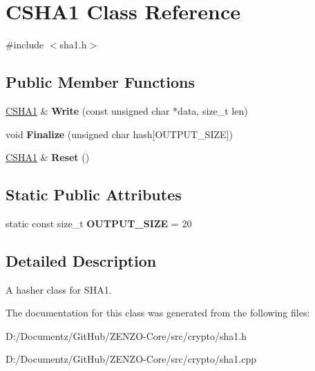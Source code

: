 \hypertarget{class_c_s_h_a1}{}\section{C\+S\+H\+A1 Class Reference}
\label{class_c_s_h_a1}


{\ttfamily \#include $<$sha1.\+h$>$}

\subsection*{Public Member Functions}
\begin{DoxyCompactItemize}
\item 
\mbox{\label{class_c_s_h_a1_a4322be694ccb2d9864e0cd0c30496a8a}} 
\mbox{\hyperlink{class_c_s_h_a1}{C\+S\+H\+A1}} \& {\bfseries Write} (const unsigned char $\ast$data, size\+\_\+t len)
\item 
\mbox{\label{class_c_s_h_a1_a9a4f829cbe511ca899d27dcab1d0d9e6}} 
void {\bfseries Finalize} (unsigned char hash\mbox{[}O\+U\+T\+P\+U\+T\+\_\+\+S\+I\+ZE\mbox{]})
\item 
\mbox{\label{class_c_s_h_a1_ab7f3006a33ddccdc1f2b2f5da9cb90af}} 
\mbox{\hyperlink{class_c_s_h_a1}{C\+S\+H\+A1}} \& {\bfseries Reset} ()
\end{DoxyCompactItemize}
\subsection*{Static Public Attributes}
\begin{DoxyCompactItemize}
\item 
\mbox{\label{class_c_s_h_a1_a4dc144e60b3e32e7b2908096ecb413ef}} 
static const size\+\_\+t {\bfseries O\+U\+T\+P\+U\+T\+\_\+\+S\+I\+ZE} = 20
\end{DoxyCompactItemize}


\subsection{Detailed Description}
A hasher class for S\+H\+A1. 

The documentation for this class was generated from the following files\+:\begin{DoxyCompactItemize}
\item 
D\+:/\+Documentz/\+Git\+Hub/\+Z\+E\+N\+Z\+O-\/\+Core/src/crypto/sha1.\+h\item 
D\+:/\+Documentz/\+Git\+Hub/\+Z\+E\+N\+Z\+O-\/\+Core/src/crypto/sha1.\+cpp\end{DoxyCompactItemize}

